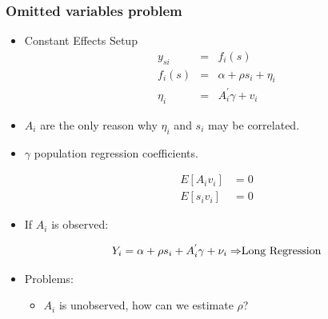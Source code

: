 \documentclass[pdftex]{beamer}
\begin{document}
\begin{frame}
\frametitle{Omitted variables problem}
\begin{itemize}
\item Constant Effects Setup
\begin{eqnarray*}
	y_{si} &=& f_{i}\left(s\right) \\
  f_{i}\left(s\right) &=& \alpha+ \rho s_{i}+ \eta_{i} \\
  \eta_{i}&=& A_{i}^{'}\gamma+ v_{i}
\end{eqnarray*}
\item $A_{i}$ are the only reason why $\eta_{i}$ and $s_{i}$ may be correlated.
\item $\gamma$ population regression coefficients.


\[\begin{array}{cl}
    E\left[A_{i}v_{i}\right]&= 0\\
    E\left[s_{i}v_{i}\right]&= 0
    \end{array}
\]

\item If $A_{i}$ is observed:


\[\begin{array}{cl}
   Y_{i} =  \alpha+ \rho s_{i}+ A_{i}^{'}\gamma+\nu_{i} \Rightarrow $Long Regression$

    \end{array}
\]

\item Problems:
\begin {itemize}

   \item $A_{i}$ is unobserved, how can we estimate $\rho$?
\end{itemize}
\end{itemize}
\end{frame}



\end{document}
